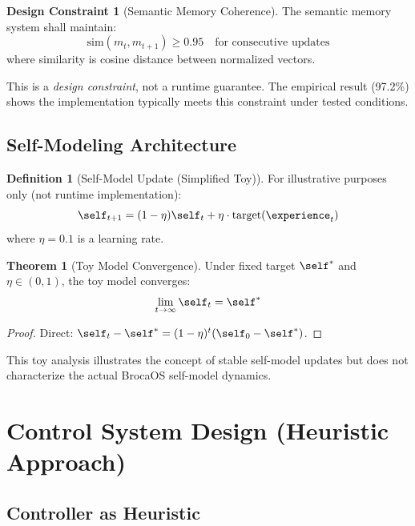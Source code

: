 \documentclass[12pt]{article}
\theoremstyle{definition}
\newtheorem{definition}{Definition}[section]
\newtheorem{theorem}{Theorem}[section]
\newtheorem{constraint}{Design Constraint}[section]
\begin{document}
\begin{constraint}[Semantic Memory Coherence]
The semantic memory system shall maintain:
\[
\text{sim}(m_t, m_{t+1}) \geq 0.95 \quad \text{for consecutive updates}
\]
where similarity is cosine distance between normalized vectors.
\end{constraint}

\begin{remark}
This is a \emph{design constraint}, not a runtime guarantee. The empirical result (97.2\%) shows the implementation typically meets this constraint under tested conditions.
\end{remark}

\subsection{Self-Modeling Architecture}

\begin{definition}[Self-Model Update (Simplified Toy)]
For illustrative purposes only (not runtime implementation):
\[
\self_{t+1} = (1-\eta)\self_t + \eta \cdot \text{target}(\experience_t)
\]
where $\eta=0.1$ is a learning rate.
\end{definition}

\begin{theorem}[Toy Model Convergence]
Under fixed target $\self^*$ and $\eta \in (0,1)$, the toy model converges:
\[
\lim_{t\to\infty} \self_t = \self^*
\]
\end{theorem}

\begin{proof}
Direct: $\self_t - \self^* = (1-\eta)^t (\self_0 - \self^*)$.
\end{proof}

\begin{remark}
This toy analysis illustrates the concept of stable self-model updates but does not characterize the actual BrocaOS self-model dynamics.
\end{remark}

\section{Control System Design (Heuristic Approach)}

\subsection{Controller as Heuristic}
\end{document}
